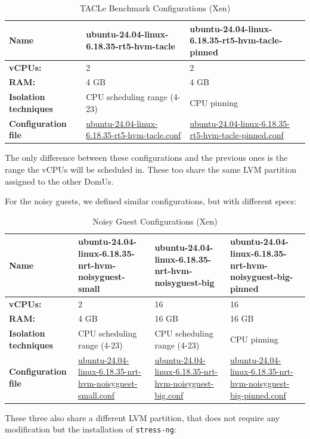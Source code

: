 \begin{table}
\centering
\caption{TACLe Benchmark Configurations (Xen)}
\label{tab:setup:xen-tacle}
\begin{tabularx}{\linewidth}{@{}YYY@{}}
\toprule
Name & ubuntu-24.04-linux-6.18.35-rt5-hvm-tacle & ubuntu-24.04-linux-6.18.35-rt5-hvm-tacle-pinned\tabularnewline
\midrule
\textbf{vCPUs:} & 2 & 2\tabularnewline
\textbf{RAM:} & 4 GB & 4 GB\tabularnewline
\textbf{Isolation techniques} & CPU scheduling range (4-23) & CPU pinning\tabularnewline
\textbf{Configuration file} & \href{Xen/domains/ubuntu-24.04-linux-6.18.35-rt5-hvm-tacle.conf}{ubuntu-24.04-linux-6.18.35-rt5-hvm-tacle.conf} & \href{Xen/domains/ubuntu-24.04-linux-6.18.35-rt5-hvm-tacle-pinned.conf}{ubuntu-24.04-linux-6.18.35-rt5-hvm-tacle-pinned.conf}\tabularnewline
\bottomrule
\end{tabularx}
\end{table}

The only difference between these configurations and the previous ones
is the range the vCPUs will be scheduled in. These too share the same
LVM partition assigned to the other DomUs.

For the noisy guests, we defined similar configurations, but with
different specs:

\begin{table}
\centering
\caption{Noisy Guest Configurations (Xen)}
\label{tab:setup:xen-noisy}
\begin{tabularx}{\linewidth}{@{}YYYY@{}}
\toprule
Name & ubuntu-24.04-linux-6.18.35-nrt-hvm-noisyguest-small & ubuntu-24.04-linux-6.18.35-nrt-hvm-noisyguest-big & ubuntu-24.04-linux-6.18.35-nrt-hvm-noisyguest-big-pinned\tabularnewline
\midrule
\textbf{vCPUs:} & 2 & 16 & 16\tabularnewline
\textbf{RAM:} & 4 GB & 16 GB & 16 GB\tabularnewline
\textbf{Isolation techniques} & CPU scheduling range (4-23) & CPU scheduling range (4-23) & CPU pinning\tabularnewline
\textbf{Configuration file} & \href{Xen/domains/ubuntu-24.04-linux-6.18.35-nrt-hvm-noisyguest-small.conf}{ubuntu-24.04-linux-6.18.35-nrt-hvm-noisyguest-small.conf} & \href{Xen/domains/ubuntu-24.04-linux-6.18.35-nrt-hvm-noisyguest-big.conf}{ubuntu-24.04-linux-6.18.35-nrt-hvm-noisyguest-big.conf} & \href{Xen/domains/ubuntu-24.04-linux-6.18.35-nrt-hvm-noisyguest-big-pinned.conf}{ubuntu-24.04-linux-6.18.35-nrt-hvm-noisyguest-big-pinned.conf}\tabularnewline
\bottomrule
\end{tabularx}
\end{table}

These three also share a different LVM partition, that does not require
any modification but the installation of \texttt{stress-ng}:

